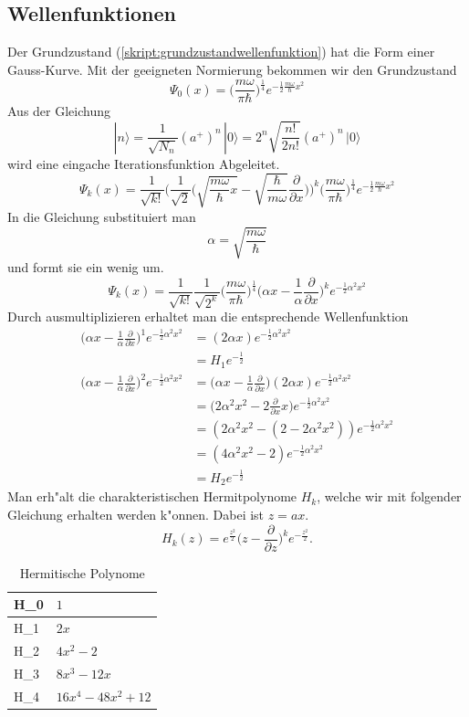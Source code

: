 \begin{refsection}
\subsection{Wellenfunktionen}
Der Grundzustand (\ref{skript:grundzustandwellenfunktion}) hat die Form einer Gauss-Kurve. Mit der geeigneten Normierung bekommen wir den Grundzustand
\[
\Psi_0(x)
=
\biggl(\frac{m\omega}{\pi\hbar}\biggr)^\frac14
e^{-\frac12\frac{m\omega}{\hbar}x^2}
\]
Aus der Gleichung
\[
|n\rangle
=
\frac{1}{\sqrt{N_n}}(a^+)^n\,|0\rangle
=
2^n \sqrt{\frac{n!}{2n!}} (a^+)^n\,|0\rangle
\]
wird eine eingache Iterationsfunktion Abgeleitet.
\[
\Psi_k(x)
=
\frac1{\sqrt{k!}}\biggl(\frac1{\sqrt{2}}
\biggl(\sqrt{\frac{m\omega}{\hbar}x}-
\sqrt{\frac{\hbar}{m\omega}}\frac{\partial}{\partial x}\biggr)\biggr)^k
\biggl(\frac{m\omega}{\pi\hbar}\biggr)^\frac14
e^{-\frac12\frac{m\omega}{\hbar}x^2}
\]
In die Gleichung substituiert man
\[
\alpha=\sqrt{\frac{m\omega}\hbar}
\]
und formt sie ein wenig um.
\[
\Psi_k(x)
=
\frac1{\sqrt{k!}}\frac1{\sqrt{2^k}}
\biggl(\frac{m\omega}{\pi\hbar}\biggr)^\frac14
\biggl(\alpha x-\frac1{\alpha}\frac{\partial}{\partial x}\biggr)^k
e^{-\frac12\alpha^2x^2}
\]
Durch ausmultiplizieren erhaltet man die entsprechende Wellenfunktion
\begin{align*}
\biggl(\alpha x-\frac1{\alpha}\frac{\partial}{\partial x}\biggr)^1
e^{-\frac12\alpha^2x^2}
&=
(2\alpha x)e^{-\frac12\alpha^2x^2}
\\
&=
H_1 e^{-\frac12}
\\
\biggl(\alpha x-\frac1{\alpha}\frac{\partial}{\partial x}\biggr)^2
e^{-\frac12\alpha^2x^2}
&=
\biggl(\alpha x-\frac1{\alpha}\frac{\partial}{\partial x}\biggr)
(2\alpha x)e^{-\frac12\alpha^2x^2}
\\
&=
\biggl(2\alpha^2 x^2-2\frac{\partial}{\partial x}x\biggr)
e^{-\frac12\alpha^2x^2}
\\
&=
(2\alpha^2x^2-(2-2\alpha^2x^2))e^{-\frac12\alpha^2x^2}
\\
&=
(4\alpha^2x^2-2)e^{-\frac12\alpha^2x^2}
\\
&=
H_2 e^{-\frac12}
\end{align*}
Man erh"alt die charakteristischen Hermitpolynome $H_k$, welche wir mit folgender Gleichung erhalten werden k"onnen. Dabei ist $z=ax$.
\[
H_k(z)
=
e^{\frac{z^2}2}\biggl(z-\frac{\partial}{\partial z}\biggr)^k
e^{-\frac{z^2}2}.
\]

\begin{table}[h]
\centering
\begin{tabular}{|l|l|}
\hline
H\_0 & $1$					\\ \hline
H\_1 & $2x$					\\ \hline
H\_2 & $4x^2-2$					\\ \hline
H\_3 & $8x^3-12x$				\\ \hline
H\_4 & $16x^4-48x^2+12$				\\ \hline
\end{tabular}
\caption{Hermitische Polynome\label{skript:Hermitpolynom}}
\end{table}


\end{refsection}
